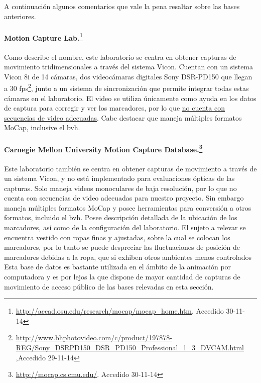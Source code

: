A continuación algunos comentarios que vale la pena resaltar sobre  las bases anteriores.

\paragraph{Motion Capture Lab.\footnote{\textcolor{blue}{\underline{\url{http://accad.osu.edu/research/mocap/mocap_home.htm}}}. Accedido 30-11-14}} 
		Como describe el nombre, este laboratorio se centra en obtener capturas de movimiento tridimensionales a través del sistema Vicon. Cuentan con un sistema Vicon 8i de 14 cámaras, dos videocámaras digitales Sony DSR-PD150 que llegan a 30 fps\footnote{\textcolor{blue}{\underline{\url{http://www.bhphotovideo.com/c/product/197878-REG/Sony_DSRPD150_DSR_PD150_Professional_1_3_DVCAM.html}}} ,Accedido 29-11-14 }, junto a un sistema de sincronización que permite integrar todas estas cámaras en el laboratorio. El video se utiliza únicamente como ayuda en los datos de captura para corregir y ver los marcadores,  por lo que \underline{no cuenta con secuencias de video adecuadas}. Cabe destacar que maneja múltiples formatos MoCap, inclusive el bvh.

\paragraph{Carnegie Mellon University Motion Capture Database.\footnote{\textcolor{blue}{\underline{\url{http://mocap.cs.cmu.edu/}}}. Accedido 30-11-14}}\label{CMU}
 Este laboratorio también se centra en obtener capturas de movimiento a través de un sistema Vicon, y no está implementado para evaluaciones ópticas de las capturas. Solo maneja videos monoculares de baja resolución, por lo que no cuenta con secuencias de video adecuadas para nuestro proyecto. Sin embargo maneja múltiples formatos MoCap y  posee herramientas para conversión a otros formatos, incluido el bvh. Posee descripción detallada de la ubicación de los marcadores, así como de la configuración del laboratorio. El sujeto a relevar se encuentra vestido con ropas finas y ajustadas, sobre la cual se colocan los marcadores, por lo tanto se puede despreciar las fluctuaciones de posición de marcadores debidas a la ropa, que si exhiben otros ambientes menos controlados  Esta base de datos es bastante utilizada en el ámbito de la  animación por computadora y es por lejos la que dispone de mayor cantidad de capturas de movimiento de acceso público de las bases relevadas en esta sección.

